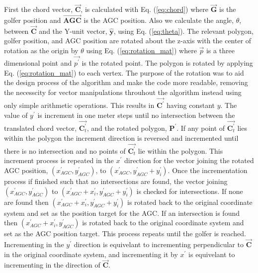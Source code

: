 \documentclass[11pt,landscape]{article}
\begin{document}
\begin{multicols}{3}
First the chord vector, $\overrightarrow{\mathbf{C}}$, is calculated with Eq. (\ref{eq:chord})
where $\overrightarrow{\mathbf{G}}$ is the golfer position and $\overrightarrow{\mathbf{AGC}}$ is
the AGC position. Also we calculate the angle, $\theta$, between
$\overrightarrow{\mathbf{C}}$ and the Y-unit vector, $\hat{\mathbf{y}}$, using
Eq. (\ref{eq:theta}).  The relevant polygon, golfer position, and AGC position are rotated
about the z-axis with the center of rotation as the origin by $\theta$ using Eq.
(\ref{eq:rotation_mat}) where $\overrightarrow{p}$ is a three dimensional point and
$\overrightarrow{p^\prime}$ is the rotated point. The polygon is rotated by
applying Eq. (\ref{eq:rotation_mat}) to each vertex. The purpose of the rotation was to aid the
design process of the algorithm and make the code more readable, removing the
necesscity for vector manipulations throuhout the algorithm instead using only
simple arithmetic operations. This results in
$\overrightarrow{\mathbf{C}^\prime}$ having constant $y$. The value of
$y^\prime$ is increment in one meter steps until no intersection between the
translated chord vector, $\overrightarrow{\mathbf{C}^\prime_t}$, and the rotated
polygon, $\mathbf{P}^\prime$. If any point of
$\overrightarrow{\mathbf{C}^\prime_t}$ lies within the polygon the increment
direction is reversed and incremented until there is no intersection and no
points of $\overrightarrow{\mathbf{C}^\prime_t}$ lie within the polygon. This
increment process is repeated in the $x^\prime$ direction for the vector joining
the rotated AGC position, $\left(x^\prime_{AGC}, y^\prime_{AGC}\right)$, to
$\left(x^\prime_{AGC}, y^\prime_{AGC} + y^\prime_i\right)$. Once the
incrementation process if finished such that no intersections are found, the
vector joining $\left(x^\prime_{AGC}, y^\prime_{AGC}\right)$ to
$\left(x^\prime_{AGC}+x^\prime_i, y^\prime_{AGC} + y^\prime_i\right)$ is checked
for intersections. If none are found then $\left(x^\prime_{AGC}+x^\prime_i,
y^\prime_{AGC} + y^\prime_i\right)$ is rotated back to the original coordinate
system and set as the position target for the AGC. If an intersection is found
then $\left(x^\prime_{AGC}+x^\prime_i, y^\prime_{AGC}\right)$ is rotated back to
the original coordinate system and set as the AGC position target. This process
repeats until the golfer is reached. Incrementing in the $y^\prime$ direction is
equivelant to incrementing perpendicular to $\overrightarrow{\mathbf{C}}$ in the
original coordinate system, and incrementing it by $x^\prime$ is equivelant to
incrementing in the direction of $\overrightarrow{\mathbf{C}}$.


\end{multicols}
\end{document}
